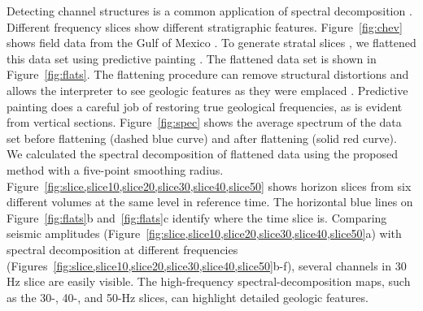 Detecting channel structures is a common application of spectral
decomposition \cite[]{Partyka1999}. Different frequency slices show
different stratigraphic features. Figure~\ref{fig:chev} shows field
data from the Gulf of Mexico \cite[]{Lomask2006}. To generate stratal
slices \cite[]{Zeng1998}, we flattened this data set using predictive
painting \cite[]{Fomel2010}. The flattened data set is shown in
Figure~\ref{fig:flats}. The flattening procedure can remove structural
distortions and allows the interpreter to see geologic features as
they were emplaced \cite[]{Lomask2006}. Predictive painting does a
careful job of restoring true geological frequencies, as is evident
from vertical sections. Figure~\ref{fig:spec} shows the average
spectrum of the data set before flattening (dashed blue curve) and
after flattening (solid red curve).  We calculated the spectral
decomposition of flattened data using the proposed method with a
five-point smoothing
radius. Figure~\ref{fig:slice,slice10,slice20,slice30,slice40,slice50}
shows horizon slices from six different volumes at the same level in
reference time. The horizontal blue lines on Figure~\ref{fig:flats}b
and~\ref{fig:flats}c identify where the time slice is. Comparing
seismic amplitudes
(Figure~\ref{fig:slice,slice10,slice20,slice30,slice40,slice50}a) with
spectral decomposition at different frequencies
(Figures~\ref{fig:slice,slice10,slice20,slice30,slice40,slice50}b-f),
several channels in 30 Hz slice are easily visible. The high-frequency
spectral-decomposition maps, such as the 30-, 40-, and 50-Hz slices,
can highlight detailed geologic features.





